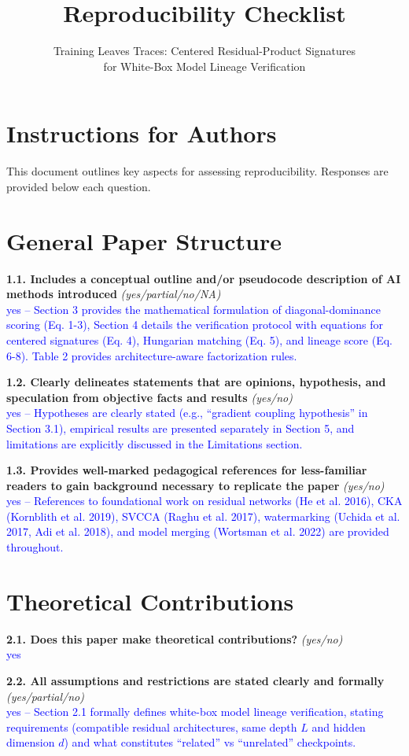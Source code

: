 \documentclass[letterpaper]{article}
\title{Reproducibility Checklist}
\author{Training Leaves Traces: Centered Residual-Product Signatures\\for White-Box Model Lineage Verification}
\date{}
\newcommand{\question}[3]{%
    \textbf{#1} \textit{#2}\\
    \textcolor{blue}{#3}\par
}
\begin{document}
\maketitle

\section*{Instructions for Authors}
This document outlines key aspects for assessing reproducibility. Responses are provided below each question.

\section{General Paper Structure}

\question{1.1. Includes a conceptual outline and/or pseudocode description of AI methods introduced}
{(yes/partial/no/NA)}
{yes -- Section 3 provides the mathematical formulation of diagonal-dominance scoring (Eq. 1-3), Section 4 details the verification protocol with equations for centered signatures (Eq. 4), Hungarian matching (Eq. 5), and lineage score (Eq. 6-8). Table 2 provides architecture-aware factorization rules.}

\question{1.2. Clearly delineates statements that are opinions, hypothesis, and speculation from objective facts and results}
{(yes/no)}
{yes -- Hypotheses are clearly stated (e.g., ``gradient coupling hypothesis'' in Section 3.1), empirical results are presented separately in Section 5, and limitations are explicitly discussed in the Limitations section.}

\question{1.3. Provides well-marked pedagogical references for less-familiar readers to gain background necessary to replicate the paper}
{(yes/no)}
{yes -- References to foundational work on residual networks (He et al. 2016), CKA (Kornblith et al. 2019), SVCCA (Raghu et al. 2017), watermarking (Uchida et al. 2017, Adi et al. 2018), and model merging (Wortsman et al. 2022) are provided throughout.}

\section{Theoretical Contributions}

\question{2.1. Does this paper make theoretical contributions?}
{(yes/no)}
{yes}

\question{2.2. All assumptions and restrictions are stated clearly and formally}
{(yes/partial/no)}
{yes -- Section 2.1 formally defines white-box model lineage verification, stating requirements (compatible residual architectures, same depth $L$ and hidden dimension $d$) and what constitutes ``related'' vs ``unrelated'' checkpoints.}
\end{document}
